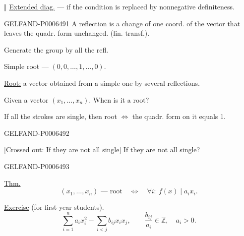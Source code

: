 \(\Vert\) \underline{Extended diag.} --- if the condition is replaced by nonnegative definiteness.


\begin{GelfandAdjacentEvidence}{GELFAND-P000649}{1}
A reflection is a change of one coord. of the vector that leaves the quadr. form unchanged. (lin. transf.).

Generate the group by all the refl.

Simple root --- \((0,0,\ldots,1,\ldots,0)\).

\underline{Root:} a vector obtained from a simple one by several reflections.

Given a vector \((x_1,\ldots,x_n)\). When is it a root?

If all the strokes are single, then root \(\Longleftrightarrow\) the quadr. form on it equals 1.
\end{GelfandAdjacentEvidence}
\begin{GelfandAdjacentEvidence}{GELFAND-P000649}{2}


[Crossed out: If they are not all single] If they are not all single?
\end{GelfandAdjacentEvidence}
\begin{GelfandAdjacentEvidence}{GELFAND-P000649}{3}


\underline{Thm.}
\[
(x_1,\ldots,x_n)\text{ --- root}\quad\Longleftrightarrow\quad
\forall i:\ f(x)\mid a_i x_i.
\]

\underline{Exercise} (for first-year students).
\[
\sum_{i=1}^{n} a_i x_i^2-\sum_{i<j}b_{ij}x_ix_j,
\qquad \frac{b_{ij}}{a_i}\in\mathbb{Z},\quad a_i>0.
\]

\end{GelfandAdjacentEvidence}
